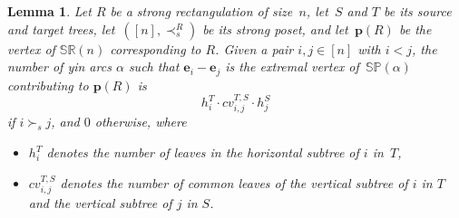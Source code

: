 \documentclass{amsart}
\newtheorem{lemma}[theorem]{Lemma}
\theoremstyle{definition}
\renewcommand{\b}[1]{{\boldsymbol{#1}}} %
\newcommand{\polytope}[1]{\mathds{#1}} %
\newcommand{\SRP}{\polytope{SR}} %
\newcommand{\SP}{\polytope{SP}}
\begin{document}
\begin{lemma}
  \label{lem:yincount}
  Let $R$ be a strong rectangulation of size~$n$, let~$S$ and $T$ be its source and target trees, let~$([n],\prec_s^R)$ be its strong poset, and let~$\b{p}(R)$ be the vertex of $\SRP(n)$ corresponding to $R$.
  Given a pair $i,j\in [n]$ with $i<j$, the number of yin arcs $\alpha$ such that $\b{e}_i-\b{e}_j$ is the extremal vertex of~$\SP(\alpha)$ contributing to $\b{p}(R)$ is
  \[
    h^T_i \cdot cv^{T,S}_{i,j}\cdot h^S_j 
  \]
  if $i\succ_s j$, and $0$ otherwise, where
  \begin{itemize}
  \item $h^T_i$ denotes the number of leaves in the horizontal subtree of $i$ in~$T$,
  \item $cv^{T,S}_{i,j}$ denotes the number of common leaves of the vertical subtree of $i$ in $T$ and the vertical subtree of $j$ in $S$.
  \end{itemize}  
\end{lemma}
\end{document}
